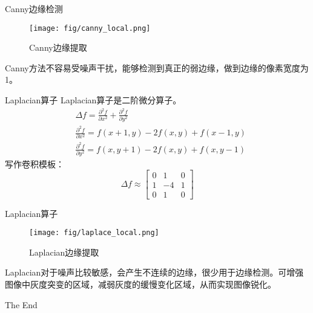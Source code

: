 \documentclass[10.5pt]{beamer}
\begin{document}
\begin{frame}{Canny边缘检测}
\begin{figure}[!t]
\centering
\texttt{[image: fig/canny\_local.png]}
\caption{Canny边缘提取}
\label{fig_6}
\end{figure}
Canny方法不容易受噪声干扰，能够检测到真正的弱边缘，做到边缘的像素宽度为1。
\end{frame}

\begin{frame}{Laplacian算子}
Laplacian算子是二阶微分算子。
\begin{equation}\nonumber
\begin{aligned}
&\Delta f = \frac{\partial^{2} f}{\partial x^2} + \frac{\partial^{2} f}{\partial y^2} \\
&\frac{\partial^{2} f}{\partial x^2} = f(x+1,y) - 2f(x,y) + f(x-1,y) \\
&\frac{\partial^{2} f}{\partial y^2} = f(x,y+1) - 2f(x,y) + f(x,y-1) 
\end{aligned}
\end{equation}
写作卷积模板：
$$
\Delta f \approx
\begin{bmatrix}
0 & 1 & 0 \\
1 & -4 & 1 \\
0 & 1 & 0
\end{bmatrix}
$$
\end{frame}

\begin{frame}{Laplacian算子}
\begin{figure}[!t]
\centering
\texttt{[image: fig/laplace\_local.png]}
\caption{Laplacian边缘提取}
\label{fig_7}
\end{figure}

Laplacian对于噪声比较敏感，会产生不连续的边缘，很少用于边缘检测。可增强图像中灰度突变的区域，减弱灰度的缓慢变化区域，从而实现图像锐化。

\end{frame}
\begin{frame}
\huge{\centerline{The End}}
\end{frame}
\end{document}
